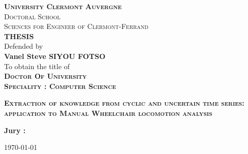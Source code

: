 \begin{titlepage}
\begin{center}
\large{ \textbf{ \textsc{University Clermont Auvergne} } }\\
\large{ \textsc{Doctoral School} }\\
\large{ \textsc{Sciences for Engineer of Clermont-Ferrand} }\\
\large{ \textbf{ \textsc{THESIS}}}\\
Defended by\\
\large{ \textbf{ Vanel Steve SIYOU FOTSO}}\\
To obtain the title of\\
\large{ \textbf{ \textsc{Doctor Of University}}}\\

\large{ \textbf{\textsc{ Speciality : Computer Science}}}\\

\end{center}
\hrulefill
\begin{center}\bfseries\Huge
    \textsc{Extraction of knowledge from cyclic and uncertain time series: application to Manual Wheelchair locomotion analysis}
\end{center}
\hrulefill
\vspace*{1cm}
    
\begin{center}%
\textbf{ Jury : }\\

\end{center}
\begin{flushright}
        \today 
\end{flushright}   
\end{titlepage}